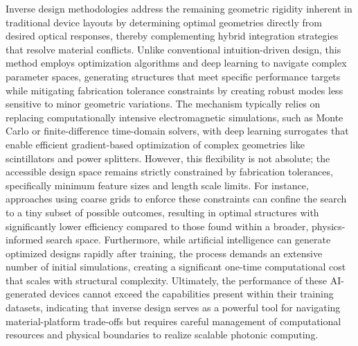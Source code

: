 \documentclass[11pt]{article}
\begin{document}
Inverse design methodologies address the remaining geometric rigidity inherent in traditional device layouts by determining optimal geometries directly from desired optical responses, thereby complementing hybrid integration strategies that resolve material conflicts. \citep{doi_10_1364_oe_524318_cf5f0d79} \citep{doi_10_1364_ol_453299_4bc70b17} Unlike conventional intuition-driven design, this method employs optimization algorithms and deep learning to navigate complex parameter spaces, generating structures that meet specific performance targets while mitigating fabrication tolerance constraints by creating robust modes less sensitive to minor geometric variations. The mechanism typically relies on replacing computationally intensive electromagnetic simulations, such as Monte Carlo or finite-difference time-domain solvers, with deep learning surrogates that enable efficient gradient-based optimization of complex geometries like scintillators and power splitters. \citep{doi_10_1109_jmmct_2026_3695747_9d633c4d} \citep{doi_10_17725_j_rensit_2026_18_163_741010b8} However, this flexibility is not absolute; the accessible design space remains strictly constrained by fabrication tolerances, specifically minimum feature sizes and length scale limits. For instance, approaches using coarse grids to enforce these constraints can confine the search to a tiny subset of possible outcomes, resulting in optimal structures with significantly lower efficiency compared to those found within a broader, physics-informed search space. Furthermore, while artificial intelligence can generate optimized designs rapidly after training, the process demands an extensive number of initial simulations, creating a significant one-time computational cost that scales with structural complexity. Ultimately, the performance of these AI-generated devices cannot exceed the capabilities present within their training datasets, indicating that inverse design serves as a powerful tool for navigating material-platform trade-offs but requires careful management of computational resources and physical boundaries to realize scalable photonic computing. \citep{doi_10_1515_nanoph_2024_0536_4b6631ba} \citep{doi_10_1515_nanoph_2023_0852_cb27a26f} \citep{doi_10_1109_cleo_europe_eqec65582_2025_11110329_26a41a7d}
\end{document}
